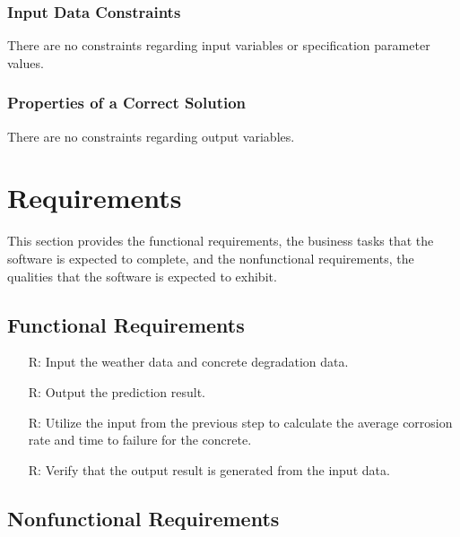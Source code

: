\documentclass[12pt]{article}
\newcounter{reqnum} %
\begin{document}
\subsubsection{Input Data Constraints} \label{sec_DataConstraints}    

There are no constraints regarding input variables or specification parameter values.

\subsubsection{Properties of a Correct Solution} \label{sec_CorrectSolution}

There are no constraints regarding output variables.

\section{Requirements}

This section provides the functional requirements, the business tasks that the
software is expected to complete, and the nonfunctional requirements, the
qualities that the software is expected to exhibit.

\subsection{Functional Requirements}

\noindent \begin{itemize}

\item[R\refstepcounter{reqnum}\thereqnum \label{R_Inputs}:] Input the weather data and concrete degradation data.

\item[R\refstepcounter{reqnum}\thereqnum \label{R_Output}:] Output the prediction result.

\item[R\refstepcounter{reqnum}\thereqnum \label{R_Calculate}:] Utilize the input from the previous step to calculate the average corrosion rate and time to failure for the concrete.

\item[R\refstepcounter{reqnum}\thereqnum \label{R_VerifyOutput}:]Verify that the output result is generated from the input data.
\end{itemize}

\subsection{Nonfunctional Requirements}
\end{document}
